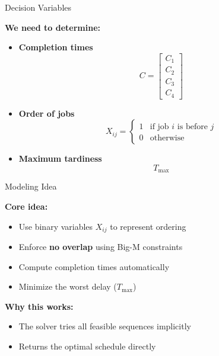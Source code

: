 \documentclass[12pt, aspectratio=169]{beamer}
\begin{document}
\begin{frame}{Decision Variables}

\textbf{We need to determine:}

\vspace{0.5em}

\begin{itemize}

\item \textbf{Completion times}
\[
C = \begin{bmatrix}C_1\\C_2\\C_3\\C_4\end{bmatrix}
\]

\item \textbf{Order of jobs}
\[
X_{ij} =
\begin{cases}
1 & \text{if job } i \text{ is before } j \\
0 & \text{otherwise}
\end{cases}
\]

\item \textbf{Maximum tardiness}
\[
T_{\max}
\]

\end{itemize}

\end{frame}


\begin{frame}{Modeling Idea}

\textbf{Core idea:}

\vspace{0.5em}

\begin{itemize}

\item Use binary variables $X_{ij}$ to represent ordering
\item Enforce \textbf{no overlap} using Big-M constraints
\item Compute completion times automatically
\item Minimize the worst delay ($T_{\max}$)

\end{itemize}

\vspace{0.7em}

\textbf{Why this works:}
\begin{itemize}
\item The solver tries all feasible sequences implicitly
\item Returns the optimal schedule directly
\end{itemize}

\end{frame}
\end{document}
